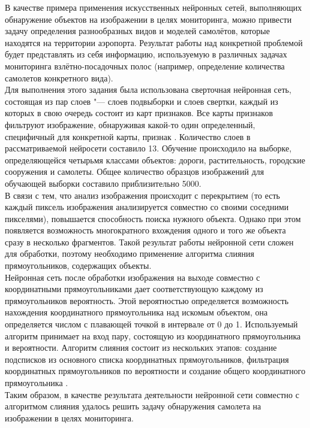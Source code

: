 \documentclass[bachelor, och, coursework]{SCWorks}
\begin{document}
        В качестве примера применения искусственных нейронных сетей, выполняющих обнаружение объектов на изображении в целях мониторинга, можно привести задачу определения разнообразных видов и моделей самолётов, которые находятся на территории аэропорта. Результат работы над конкретной проблемой будет представлять из себя информацию, используемую в различных задачах мониторинга взлётно-посадочных полос (например, определение количества самолетов конкретного вида).\\
        Для выполнения этого задания была использована сверточная нейронная сеть, состоящая из пар слоев "--- слоев подвыборки и слоев свертки, каждый из которых в свою очередь состоит из карт признаков. Все карты признаков фильтруют изображение, обнаруживая какой-то один определенный, специфичный для конкретной карты, признак \cite{Svertka}. Количество слоев в рассматриваемой нейросети составило 13. Обучение происходило на выборке, определяющейся четырьмя классами объектов: дороги, растительность, городские сооружения и самолеты. Общее количество образцов изображений для обучающей выборки составило приблизительно 5000.\\
        В связи с тем, что анализ изображения происходит с перекрытием (то есть каждый пиксель изображения анализируется совместно со своими соседними пикселями), повышается способность поиска нужного объекта. Однако при этом появляется возможность многократного вхождения одного и того же объекта сразу в несколько фрагментов. Такой результат работы нейронной сети сложен для обработки, поэтому необходимо применение алгоритма слияния прямоугольников, содержащих объекты.\\
        Нейронная сеть после обработки изображения на выходе совместно с координатными прямоугольниками дает соответствующую каждому из прямоугольников вероятность. Этой вероятностью определяется возможность нахождения координатного прямоугольника над искомым объектом, она определяется числом с плавающей точкой в интервале от 0 до 1. Используемый алгоритм принимает на вход пару, состоящую из координатного прямоугольника и вероятности. Алгоритм слияния состоит из нескольких этапов: создание подсписков из основного списка координатных прямоугольников, фильтрация координатных прямоугольников по вероятности и создание общего координатного прямоугольника \cite{aero}. \\
        Таким образом, в качестве результата деятельности нейронной сети совместно с алгоритмом слияния удалось решить задачу обнаружения самолета на изображении в целях мониторинга.
\end{document}
